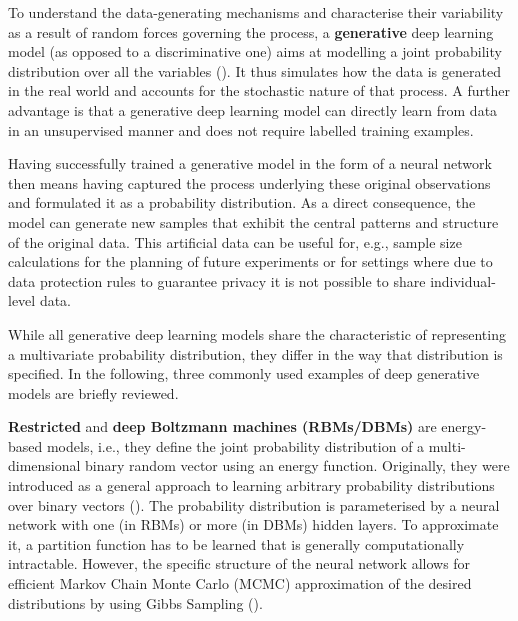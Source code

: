 To understand the data-generating mechanisms and characterise their variability as a result of random forces governing the process, a \textbf{generative} deep learning model (as opposed to a discriminative one) aims at modelling a joint probability distribution over all the variables (\cite[Chapter~20, p.~651]{Goodfellow2016}). It thus simulates how the data is generated in the real world and accounts for the stochastic nature of that process. A further advantage is that a generative deep learning model can directly learn from data in an unsupervised manner and does not require labelled training examples. 

Having successfully trained a generative model in the form of a neural network then means having captured the process underlying these original observations and formulated it as a probability distribution. As a direct consequence, the model can generate new samples that exhibit the central patterns and structure of the original data. This artificial data can be useful for, e.g., sample size calculations for the planning of future experiments or for settings where due to data protection rules to guarantee privacy it is not possible to share individual-level data.   

While all generative deep learning models share the characteristic of representing a multivariate probability distribution, they differ in the way that distribution is specified. 
In the following, three commonly used examples of deep generative models are briefly reviewed. 

\textbf{Restricted} and \textbf{deep Boltzmann machines (RBMs/DBMs)} are energy-based models, i.e., they define the joint probability distribution of a multi-dimensional binary random vector using an energy function. Originally, they were introduced as a general approach to learning arbitrary probability distributions over binary vectors (\cite{Salakhutdinov09}). The probability distribution is parameterised by a neural network with one (in RBMs) or more (in DBMs) hidden layers. To approximate it, a partition function has to be learned that is generally computationally intractable. However, the specific structure of the neural network allows for efficient Markov Chain Monte Carlo (MCMC) approximation of the desired distributions by using Gibbs Sampling (\cite[Chapter~20, pp.~651-662]{Goodfellow2016}).

